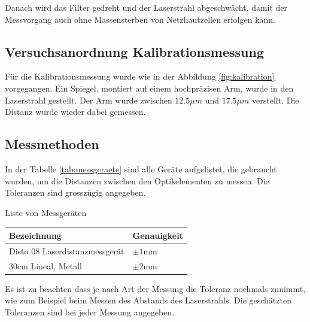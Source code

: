 Danach  wird  das  Filter  gedreht und der Laserstrahl abgeschw\"acht, damit der
Messvorgang   auch   ohne   Massensterben   von  Netzhautzellen  erfolgen  kann.


\subsection{Versuchsanordnung Kalibrationsmessung}

F\"ur die Kalibrationsmessung wurde wie in  der  Abbildung \ref{fig:kalibration}
vorgegangen.  Ein  Spiegel,  montiert auf einem hochpr\"azisen Arm, wurde in den
Laserstrahl  gestellt.  Der   Arm   wurde   zwischen   $12.5\mu m$   und
$17.5\mu m$  verstellt.   Die   Distanz  wurde  wieder  dabei  gemessen.

\subsection{Messmethoden}

In  der  Tabelle  \ref{tab:messgeraete}  sind  alle  Ger\"ate  aufgelistet,  die
gebraucht  wurden,  um  die Distanzen zwischen den Optikelementen zu messen. Die
Toleranzen  sind grossz\"ugig angegeben.

\begin{center}
    \begin{threeparttable}
        \caption{Liste von Messger\"aten}
        \label{tab:messgeraete}
        \begin{tabular}{ll}
            \toprule
            Bezeichnung                         & Genauigkeit \\
            \midrule
            Disto 08 Laserdistanzmessger\"at    & $\pm1\textrm{mm}$ \\
            $30\textrm{cm}$ Lineal, Metall      & $\pm2\textrm{mm}$ \\
            \bottomrule
        \end{tabular}
    \end{threeparttable}
\end{center}

Es ist zu beachten dass je nach Art der
Messung die Toleranz nochmals zunimmt, wie zum Beispiel beim Messen des Abstands
des Laserstrahls. Die gesch\"atzten Toleranzen sind bei jeder Messung angegeben.

